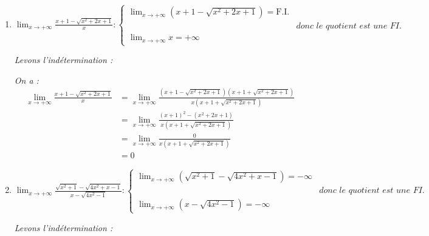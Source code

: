 \documentclass[12pt,a4paper]{article}
\begin{document}
\begin{enumerate}
    \item 
    $
    \displaystyle \lim_{x \to +\infty} \frac{x + 1 - \sqrt{x^2 + 2x + 1}}{x}:
    \begin{cases}
    \displaystyle \lim_{x \to +\infty} (x + 1 - \sqrt{x^2 + 2x + 1}) = \text{F.I.}\\[3mm]
    &\textit{donc le quotient est une FI.}\\
    \displaystyle \lim_{x \to +\infty} x = +\infty
    \end{cases}
    $

    \textit{Levons l'indétermination :}
    
    \textit{On a :}
    \begin{align*}
        \displaystyle \lim_{x \to +\infty} \frac{x + 1 - \sqrt{x^2 + 2x + 1}}{x} &= \lim_{x \to +\infty} \frac{(x + 1 - \sqrt{x^2 + 2x + 1})(x + 1 + \sqrt{x^2 + 2x + 1})}{x(x + 1 + \sqrt{x^2 + 2x + 1})} \\
        &= \lim_{x \to +\infty} \frac{(x + 1)^2 - (x^2 + 2x + 1)}{x(x + 1 + \sqrt{x^2 + 2x + 1})} \\
        &= \lim_{x \to +\infty} \frac{0}{x(x + 1 + \sqrt{x^2 + 2x + 1})} \\
        &= 0
    \end{align*}
    
    \vspace{0.2cm}
    
     

    \vspace{0.6cm}

    \item 
    $
    \displaystyle \lim_{x \to +\infty} \frac{\sqrt{x^2 + 1} - \sqrt{4x^2 + x - 1}}{x - \sqrt{4x^2 - 1}}:
    \begin{cases}
    \displaystyle \lim_{x \to +\infty} (\sqrt{x^2 + 1} - \sqrt{4x^2 + x - 1}) = -\infty\\[3mm]
    &\textit{donc le quotient est une FI.}\\
    \displaystyle \lim_{x \to +\infty} (x - \sqrt{4x^2 - 1}) = -\infty
    \end{cases}
    $

    \textit{Levons l'indétermination :}
    

\end{enumerate}
\end{document}
